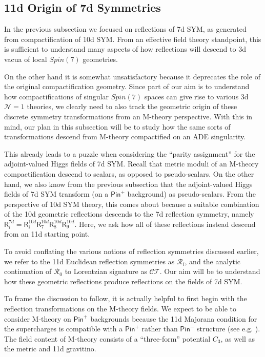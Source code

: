 \documentclass[12pt]{article}%
\numberwithin{equation}{section}
\renewcommand{\(}{\left(}
\renewcommand{\)}{\right)}
\renewcommand{\[}{\left[}
\renewcommand{\]}{\right]}
\begin{document}
\subsection{11d Origin of 7d Symmetries}

In the previous subsection we focused on reflections of 7d SYM, as generated from compactification of 10d SYM.
From an effective field theory standpoint, this is sufficient to understand many aspects of how reflections
will descend to 3d vacua of local $Spin(7)$ geometries.

On the other hand it is somewhat unsatisfactory because it deprecates the role of the original compactification
geometry. Since part of our aim is to understand how compactifications of singular $Spin(7)$ spaces
can give rise to various 3d $\mathcal{N} = 1$ theories, we clearly need to also track the geometric origin
of these discrete symmetry transformations from an M-theory perspective.
With this in mind, our plan in this subsection will be to study how the same sorts
of transformations descend from M-theory compactified on an
ADE singularity.

This already leads to a puzzle when considering the ``parity assignment'' for the adjoint-valued Higgs fields of 7d SYM.
Recall that metric moduli of an M-theory compactification descend to scalars, as opposed to pseudo-scalars.
On the other hand, we also know from the previous subsection that the adjoint-valued Higgs fields
of 7d SYM transform (on a $\mathsf{Pin}^+$ background) as pseudo-scalars. From the perspective of 10d SYM theory,
this comes about because a suitable combination of the 10d geometric reflections descends to the 7d reflection symmetry,
namely $\mathsf{R}_{i}^{7d} = \mathsf{R}_{i}^{10d} \mathsf{R}_{7}^{10d} \mathsf{R}_{8}^{10d} \mathsf{R}_{9}^{10d}$.
Here, we ask how all of these reflections instead descend from an 11d starting point.

To avoid conflating the various notions of reflection symmetries discussed earlier, we refer to the 11d Euclidean
reflection symmetries as $\mathcal{R}_{i}$, and the analytic continuation of $\mathcal{R}_0$ to Lorentzian signature
as $\mathcal{CT}$. Our aim will be to understand how these geometric reflections produce reflections on the fields of 7d SYM.

To frame the discussion to follow, it is actually helpful to first begin with the reflection transformations on the M-theory
fields. We expect to be able to consider M-theory on $\mathsf{Pin}^{+}$ backgrounds because the 11d Majorana condition for the supercharges is compatible with a $\mathsf{Pin}^{+}$ rather than $\mathsf{Pin}^{-}$ structure (see e.g. \cite{Berg:2000ne, Tachikawa:2018njr}). The field content of M-theory consists of a ``three-form'' potential $C_3$, as well as the metric and 11d gravitino.
\end{document}

